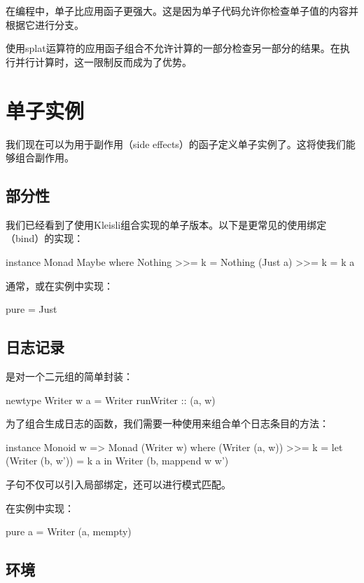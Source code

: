 \documentclass[DaoFP]{subfiles}
\begin{document}
在编程中，单子比应用函子更强大。这是因为单子代码允许你检查单子值的内容并根据它进行分支。

使用splat运算符的应用函子组合不允许计算的一部分检查另一部分的结果。在执行并行计算时，这一限制反而成为了优势。

\section{单子实例}

我们现在可以为用于副作用（side effects）的函子定义单子实例了。这将使我们能够组合副作用。

\subsection{部分性}
我们已经看到了使用Kleisli组合实现的单子版本。以下是更常见的使用绑定（bind）的实现：
\begin{haskell}
instance Monad Maybe where
  Nothing  >>= k = Nothing
  (Just a) >>= k = k a
\end{haskell}
通常，或在实例中实现：
\begin{haskell}
  pure = Just
\end{haskell}

\subsection{日志记录}
是对一个二元组的简单封装：
\begin{haskell}
newtype Writer w a = Writer { runWriter :: (a, w) }
\end{haskell}

为了组合生成日志的函数，我们需要一种使用来组合单个日志条目的方法：
\begin{haskell}
instance Monoid w => Monad (Writer w) where
  (Writer (a, w)) >>= k = let (Writer (b, w')) = k a
                          in Writer (b, mappend w w')
\end{haskell}
子句不仅可以引入局部绑定，还可以进行模式匹配。

在实例中实现：
\begin{haskell}
  pure a = Writer (a, mempty)
\end{haskell}

\subsection{环境}
\end{document}
